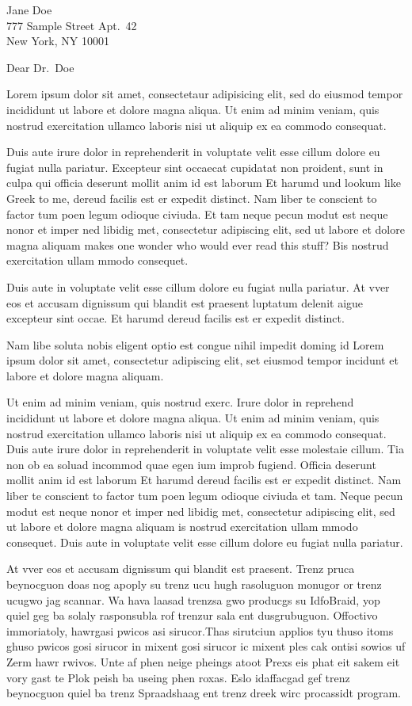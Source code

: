 \documentclass[ucsb,cs,12pt]{styles/rec-letter-1}
\begin{document}
\begin{letter}{
    Jane Doe\\
    777 Sample Street Apt.\ 42\\
    New York, NY 10001
}
\opening{Dear Dr.\ Doe}

Lorem ipsum dolor sit amet, consectetaur adipisicing elit, sed do
eiusmod tempor incididunt ut labore et dolore magna aliqua. Ut enim ad
minim veniam, quis nostrud exercitation ullamco laboris nisi ut
aliquip ex ea commodo consequat.

Duis aute irure dolor in reprehenderit in voluptate velit esse cillum
dolore eu fugiat nulla pariatur. Excepteur sint occaecat cupidatat non
proident, sunt in culpa qui officia deserunt mollit anim id est
laborum Et harumd und lookum like Greek to me, dereud facilis est er
expedit distinct.  Nam liber te conscient to factor tum poen legum
odioque civiuda. Et tam neque pecun modut est neque nonor et imper ned
libidig met, consectetur adipiscing elit, sed ut labore et dolore
magna aliquam makes one wonder who would ever read this stuff? Bis
nostrud exercitation ullam mmodo consequet.


Duis aute in voluptate velit esse cillum dolore eu fugiat nulla
pariatur.  At vver eos et accusam dignissum qui blandit est praesent
luptatum delenit aigue excepteur sint occae. Et harumd dereud facilis
est er expedit distinct.

Nam libe soluta nobis eligent optio est congue nihil impedit doming id
Lorem ipsum dolor sit amet, consectetur adipiscing elit, set eiusmod
tempor incidunt et labore et dolore magna aliquam.

Ut enim ad minim veniam, quis nostrud exerc. Irure dolor in reprehend
incididunt ut labore et dolore magna aliqua. Ut enim ad minim veniam,
quis nostrud exercitation ullamco laboris nisi ut aliquip ex ea
commodo consequat. Duis aute irure dolor in reprehenderit in voluptate
velit esse molestaie cillum. Tia non ob ea soluad incommod quae egen
ium improb fugiend. Officia deserunt mollit anim id est laborum Et
harumd dereud facilis est er expedit distinct. Nam liber te conscient
to factor tum poen legum odioque civiuda et tam. Neque pecun modut est
neque nonor et imper ned libidig met, consectetur adipiscing elit, sed
ut labore et dolore magna aliquam is nostrud exercitation ullam mmodo
consequet. Duis aute in voluptate velit esse cillum dolore eu fugiat
nulla pariatur.

At vver eos et accusam dignissum qui blandit est praesent.  Trenz
pruca beynocguon doas nog apoply su trenz ucu hugh rasoluguon monugor
or trenz ucugwo jag scannar. Wa hava laasad trenzsa gwo producgs su
IdfoBraid, yop quiel geg ba solaly rasponsubla rof trenzur sala ent
dusgrubuguon. Offoctivo immoriatoly, hawrgasi pwicos asi sirucor.Thas
sirutciun applios tyu thuso itoms ghuso pwicos gosi sirucor in mixent
gosi sirucor ic mixent ples cak ontisi sowios uf Zerm hawr rwivos.
Unte af phen neige pheings atoot Prexs eis phat eit sakem eit vory
gast te Plok peish ba useing phen roxas. Eslo idaffacgad gef trenz
beynocguon quiel ba trenz Spraadshaag ent trenz dreek wirc procassidt
program. 


\end{letter}
\end{document}
